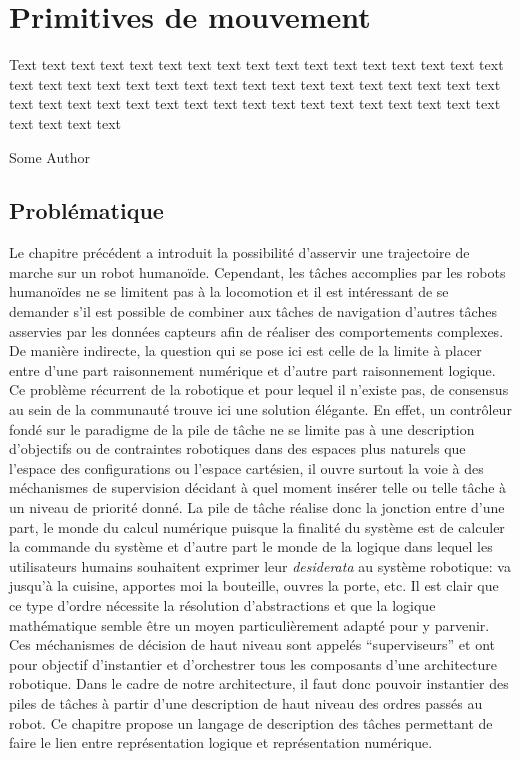 \chapter{Primitives de mouvement}
\label{chap:primitive}

\epigraph{Text text text text text text text text text text text text
  text text text text text text text text text text text text text
  text text text text text text text text text text text text text
  text text text text text text text text text text text text text
  text text text text}{Some Author}
\clearpage

\section{Problématique}

Le chapitre précédent a introduit la possibilité d'asservir une
trajectoire de marche sur un robot humanoïde. Cependant, les tâches
accomplies par les robots humanoïdes ne se limitent pas à la
locomotion et il est intéressant de se demander s'il est possible de
combiner aux tâches de navigation d'autres tâches asservies par les
données capteurs afin de réaliser des comportements complexes. De
manière indirecte, la question qui se pose ici est celle de la limite
à placer entre d'une part raisonnement numérique et d'autre part
raisonnement logique. Ce problème récurrent de la robotique et pour
lequel il n'existe pas, de consensus au sein de la communauté trouve
ici une solution élégante. En effet, un contrôleur fondé sur le
paradigme de la pile de tâche ne se limite pas à une description
d'objectifs ou de contraintes robotiques dans des espaces plus
naturels que l'espace des configurations ou l'espace cartésien, il
ouvre surtout la voie à des méchanismes de supervision décidant à quel
moment insérer telle ou telle tâche à un niveau de priorité donné. La
pile de tâche réalise donc la jonction entre d'une part, le monde du
calcul numérique puisque la finalité du système est de calculer la
commande du système et d'autre part le monde de la logique dans lequel
les utilisateurs humains souhaitent exprimer leur \emph{desiderata} au
système robotique: va jusqu'à la cuisine, apportes moi la bouteille,
ouvres la porte, etc. Il est clair que ce type d'ordre nécessite la
résolution d'abstractions et que la logique mathématique semble être
un moyen particulièrement adapté pour y parvenir. Ces méchanismes de
décision de haut niveau sont appelés ``superviseurs'' et ont pour
objectif d'instantier et d'orchestrer tous les composants d'une
architecture robotique. Dans le cadre de notre architecture, il faut
donc pouvoir instantier des piles de tâches à partir d'une description
de haut niveau des ordres passés au robot. Ce chapitre propose un
langage de description des tâches permettant de faire le lien entre
représentation logique et représentation numérique.



